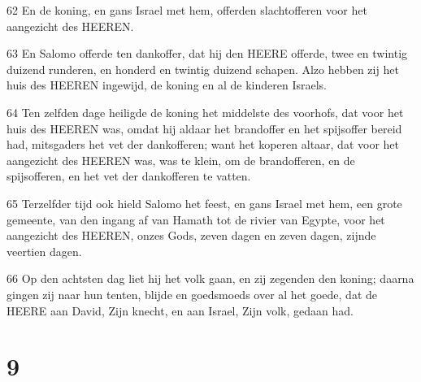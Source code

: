 \par 62 En de koning, en gans Israel met hem, offerden slachtofferen voor het aangezicht des HEEREN.
\par 63 En Salomo offerde ten dankoffer, dat hij den HEERE offerde, twee en twintig duizend runderen, en honderd en twintig duizend schapen. Alzo hebben zij het huis des HEEREN ingewijd, de koning en al de kinderen Israels.
\par 64 Ten zelfden dage heiligde de koning het middelste des voorhofs, dat voor het huis des HEEREN was, omdat hij aldaar het brandoffer en het spijsoffer bereid had, mitsgaders het vet der dankofferen; want het koperen altaar, dat voor het aangezicht des HEEREN was, was te klein, om de brandofferen, en de spijsofferen, en het vet der dankofferen te vatten.
\par 65 Terzelfder tijd ook hield Salomo het feest, en gans Israel met hem, een grote gemeente, van den ingang af van Hamath tot de rivier van Egypte, voor het aangezicht des HEEREN, onzes Gods, zeven dagen en zeven dagen, zijnde veertien dagen.
\par 66 Op den achtsten dag liet hij het volk gaan, en zij zegenden den koning; daarna gingen zij naar hun tenten, blijde en goedsmoeds over al het goede, dat de HEERE aan David, Zijn knecht, en aan Israel, Zijn volk, gedaan had.

\chapter{9}

